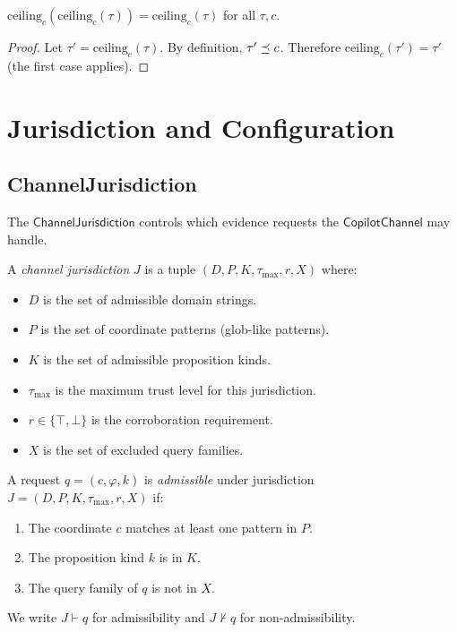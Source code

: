 \documentclass[11pt]{article}
\newcommand{\CopChan}{\mathsf{CopilotChannel}}
\newcommand{\ChanJuris}{\mathsf{ChannelJurisdiction}}
\newcommand{\TrustCeil}{\mathrm{ceiling}}
\begin{document}
\begin{lemma}
\label{lem:ceil-idemp}
$\TrustCeil_c(\TrustCeil_c(\tau)) = \TrustCeil_c(\tau)$ for all
$\tau, c$.
\end{lemma}

\begin{proof}
Let $\tau' = \TrustCeil_c(\tau)$.  By definition, $\tau' \preceq c$.
Therefore $\TrustCeil_c(\tau') = \tau'$ (the first case applies).
\end{proof}

\section{Jurisdiction and Configuration}
\label{sec:jurisdiction}

\subsection{ChannelJurisdiction}
\label{sec:jurisdiction:juris}

The $\ChanJuris$ controls which evidence requests the $\CopChan$
may handle.

\begin{definition}
\label{def:jurisdiction}
A \emph{channel jurisdiction} $J$ is a tuple
$(D, P, K, \tau_{\max}, r, X)$ where:
\begin{itemize}[leftmargin=2em]
\item $D$ is the set of admissible domain strings.
\item $P$ is the set of coordinate patterns (glob-like patterns).
\item $K$ is the set of admissible proposition kinds.
\item $\tau_{\max}$ is the maximum trust level for this jurisdiction.
\item $r \in \{\top, \bot\}$ is the corroboration requirement.
\item $X$ is the set of excluded query families.
\end{itemize}
\end{definition}

\begin{definition}[Admissibility]
\label{def:admissibility}
A request $q = (c, \varphi, k)$ is \emph{admissible} under
jurisdiction $J = (D, P, K, \tau_{\max}, r, X)$ if:
\begin{enumerate}
\item The coordinate $c$ matches at least one pattern in $P$.
\item The proposition kind $k$ is in $K$.
\item The query family of $q$ is not in $X$.
\end{enumerate}
We write $J \vdash q$ for admissibility and $J \nvdash q$ for
non-admissibility.
\end{definition}
\end{document}

